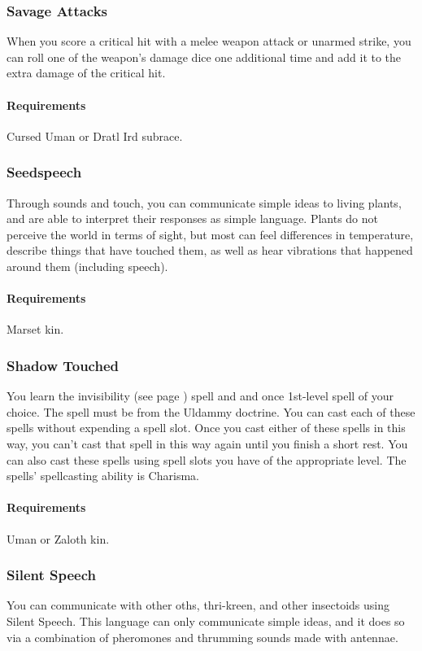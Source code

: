 \subsubsection{Savage Attacks} \label{feat::savageattacks}
    When you score a critical hit with a melee weapon attack or unarmed strike, you can roll one of the weapon's damage dice one additional time and add it to the extra damage of the critical hit.
    \paragraph{Requirements} Cursed Uman or Dratl Ird subrace.
\subsubsection{Seedspeech} \label{feat::seedspeech}
    Through sounds and touch, you can communicate simple ideas to living plants, and are able to interpret their responses as simple language.
    Plants do not perceive the world in terms of sight, but most can feel differences in temperature, describe things that have touched them, as well as hear vibrations that happened around them (including speech).
    \paragraph{Requirements} Marset kin.
\subsubsection{Shadow Touched} \label{feat::shadowtouched}
    You learn the invisibility (see page \pageref{spell::invisibility}) spell and and once 1st-level spell of your choice.
    The spell must be from the Uldammy doctrine.
    You can cast each of these spells without expending a spell slot.
    Once you cast either of these spells in this way, you can't cast that spell in this way again until you finish a short rest.
    You can also cast these spells using spell slots you have of the appropriate level.
    The spells' spellcasting ability is Charisma.
    \paragraph{Requirements} Uman or Zaloth kin.
\subsubsection{Silent Speech} \label{feat::silentspeech}
    You can communicate with other oths, thri-kreen, and other insectoids using Silent Speech.
    This language can only communicate simple ideas, and it does so via a combination of pheromones and thrumming sounds made with antennae.
